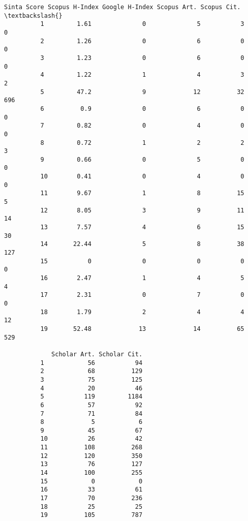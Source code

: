 \documentclass[11pt]{article}
\begin{document}
\begin{Verbatim}[commandchars=\\\{\}]
             Sinta Score Scopus H-Index Google H-Index Scopus Art. Scopus Cit.  \textbackslash{}
          1         1.61              0              5           3           0   
          2         1.26              0              6           0           0   
          3         1.23              0              6           0           0   
          4         1.22              1              4           3           2   
          5         47.2              9             12          32         696   
          6          0.9              0              6           0           0   
          7         0.82              0              4           0           0   
          8         0.72              1              2           2           3   
          9         0.66              0              5           0           0   
          10        0.41              0              4           0           0   
          11        9.67              1              8          15           5   
          12        8.05              3              9          11          14   
          13        7.57              4              6          15          30   
          14       22.44              5              8          38         127   
          15           0              0              0           0           0   
          16        2.47              1              4           5           4   
          17        2.31              0              7           0           0   
          18        1.79              2              4           4          12   
          19       52.48             13             14          65         529   
          
             Scholar Art. Scholar Cit.  
          1            56           94  
          2            68          129  
          3            75          125  
          4            20           46  
          5           119         1184  
          6            57           92  
          7            71           84  
          8             5            6  
          9            45           67  
          10           26           42  
          11          108          268  
          12          120          350  
          13           76          127  
          14          100          255  
          15            0            0  
          16           33           61  
          17           70          236  
          18           25           25  
          19          105          787  
\end{Verbatim}
        
\end{document}
